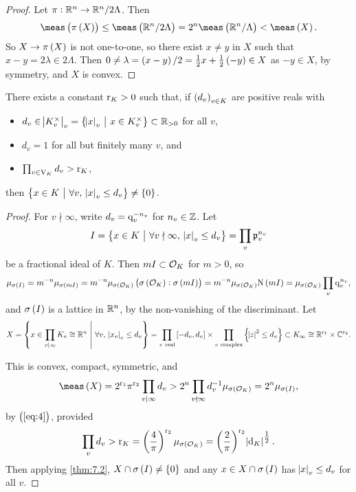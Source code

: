 \begin{proof}
Let $ \pi : \mathbb{R}^n \to \mathbb{R}^n / 2\Lambda $. Then
$$ \meas\br{\pi\br{X}} \le \meas\br{\RR^n / 2\Lambda} = 2^n\meas\br{\RR^n / \Lambda} < \meas\br{X}. $$
So $ X \to \pi\br{X} $ is not one-to-one, so there exist $ x \ne y $ in $ X $ such that $ x - y = 2\lambda \in 2\Lambda $. Then $ 0 \ne \lambda = \br{x - y} / 2 = \tfrac{1}{2}x + \tfrac{1}{2}\br{-y} \in X $ as $ -y \in X $, by symmetry, and $ X $ is convex.
\end{proof}

\begin{theorem}
\label{thm:7.3}
There exists a constant $ \mathrm{r}_K > 0 $ such that, if $ \br{d_v}_{v \in K} $ are positive reals with
\begin{itemize}
\item $ d_v \in \abs{K_v^\times}_v = \cbr{\abs{x}_v \st x \in K_v^\times} \subset \RR_{> 0} $ for all $ v $,
\item $ d_v = 1 $ for all but finitely many $ v $, and
\item $ \prod_{v \in \mathrm{V}_K} d_v > \mathrm{r}_K $,
\end{itemize}
then $ \cbr{x \in K \st \forall v, \ \abs{x}_v \le d_v} \ne \cbr{0} $.
\end{theorem}

\begin{proof}
For $ v \nmid \infty $, write $ d_v = \mathrm{q}_v^{-n_v} $ for $ n_v \in \mathbb{Z} $. Let
$$ I = \cbr{x \in K \st \forall v \nmid \infty, \ \abs{x}_v \le d_v} = \prod_v \ppp_v^{n_v} $$
be a fractional ideal of $ K $. Then $ mI \subset \mathcal{O}_K $ for $ m > 0 $, so
\begin{equation}
\label{eq:4}
\mu_{\sigma\br{I}} = m^{-n}\mu_{\sigma\br{mI}} = m^{-n}\mu_{\sigma\br{\OOO_K}}\br{\sigma\br{\OOO_K} : \sigma\br{mI}} = m^{-n}\mu_{\sigma\br{\OOO_K}}\N\br{mI} = \mu_{\sigma\br{\OOO_K}}\prod_v \q_v^{n_v},
\end{equation}
and $ \sigma\br{I} $ is a lattice in $ \mathbb{R}^n $, by the non-vanishing of the discriminant. Let
$$ X = \cbr{x \in \prod_{v \mid \infty} K_v \cong \RR^n \st \forall v, \ \abs{x_v}_v \le d_v} = \prod_{v \ \text{real}} \sbr{-d_v, d_v} \times \prod_{v \ \text{complex}} \cbr{\abs{z}^2 \le d_v} \subset K_\infty \cong \RR^{\r_1} \times \CC^{\r_2}. $$

\pagebreak

This is convex, compact, symmetric, and
$$ \meas\br{X} = 2^{\r_1}\pi^{\r_2}\prod_{v \mid \infty} d_v > 2^n\prod_{v \nmid \infty} d_v^{-1}\mu_{\sigma\br{\OOO_K}} = 2^n\mu_{\sigma\br{I}}, $$
by $ \br{\ref{eq:4}} $, provided
$$ \prod_v d_v > \r_K = \br{\dfrac{4}{\pi}}^{\r_2}\mu_{\sigma\br{\OOO_K}} = \br{\dfrac{2}{\pi}}^{\r_2}\abs{\d_K}^{\tfrac{1}{2}}. $$
Then applying \ref{thm:7.2}, $ X \cap \sigma\br{I} \ne \cbr{0} $ and any $ x \in X \cap \sigma\br{I} $ has $ \abs{x}_v \le d_v $ for all $ v $.
\end{proof}

